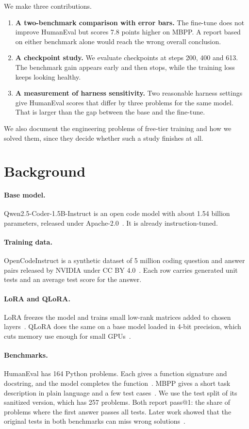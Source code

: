 \documentclass[11pt,a4paper]{article}
\begin{document}
We make three contributions.
\begin{enumerate}
\item \textbf{A two-benchmark comparison with error bars.} The fine-tune does not improve HumanEval but scores 7.8 points higher on MBPP. A report based on either benchmark alone would reach the wrong overall conclusion.
\item \textbf{A checkpoint study.} We evaluate checkpoints at steps 200, 400 and 613. The benchmark gain appears early and then stops, while the training loss keeps looking healthy.
\item \textbf{A measurement of harness sensitivity.} Two reasonable harness settings give HumanEval scores that differ by three problems for the same model. That is larger than the gap between the base and the fine-tune.
\end{enumerate}
We also document the engineering problems of free-tier training and how we solved them, since they decide whether such a study finishes at all.

\section{Background}
\paragraph{Base model.} Qwen2.5-Coder-1.5B-Instruct is an open code model with about 1.54 billion parameters, released under Apache-2.0~\cite{qwen}. It is already instruction-tuned.

\paragraph{Training data.} OpenCodeInstruct is a synthetic dataset of 5 million coding question and answer pairs released by NVIDIA under CC BY 4.0~\cite{oci}. Each row carries generated unit tests and an average test score for the answer.

\paragraph{LoRA and QLoRA.} LoRA freezes the model and trains small low-rank matrices added to chosen layers~\cite{lora}. QLoRA does the same on a base model loaded in 4-bit precision, which cuts memory use enough for small GPUs~\cite{qlora}.

\paragraph{Benchmarks.} HumanEval has 164 Python problems. Each gives a function signature and docstring, and the model completes the function~\cite{humaneval}. MBPP gives a short task description in plain language and a few test cases~\cite{mbpp}. We use the test split of its sanitized version, which has 257 problems. Both report pass@1: the share of problems where the first answer passes all tests. Later work showed that the original tests in both benchmarks can miss wrong solutions~\cite{evalplus}.
\end{document}
